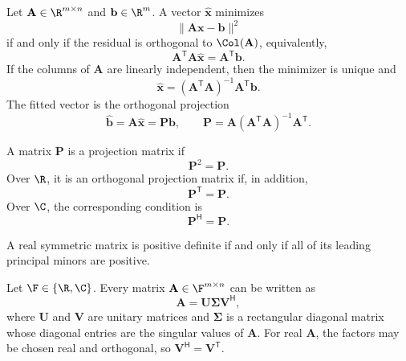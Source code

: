     \begin{theorem}
        Let $\mathbf{A}\in\R^{m\times n}$ and
        $\mathbf{b}\in\R^m$. A vector $\widehat{\mathbf{x}}$ minimizes
        \[
            \|\mathbf{A}\mathbf{x}-\mathbf{b}\|^2
        \]
        if and only if the residual is orthogonal to
        $\Col(\mathbf{A})$, equivalently,
        \[
            \mathbf{A}^{\mathsf T}\mathbf{A}\widehat{\mathbf{x}}
            =
            \mathbf{A}^{\mathsf T}\mathbf{b}.
        \]
        If the columns of $\mathbf{A}$ are linearly independent, then the
        minimizer is unique and
        \[
            \widehat{\mathbf{x}}
            =
            (\mathbf{A}^{\mathsf T}\mathbf{A})^{-1}
            \mathbf{A}^{\mathsf T}\mathbf{b}.
        \]
        The fitted vector is the orthogonal projection
        \[
            \widehat{\mathbf{b}}
            =
            \mathbf{A}\widehat{\mathbf{x}}
            =
            \mathbf{P}\mathbf{b},
            \qquad
            \mathbf{P}
            =
            \mathbf{A}(\mathbf{A}^{\mathsf T}\mathbf{A})^{-1}
            \mathbf{A}^{\mathsf T}.
        \]
    \end{theorem}

    \begin{proposition}
        A matrix $\mathbf{P}$ is a projection matrix if
        \[
            \mathbf{P}^2=\mathbf{P}.
        \]
        Over $\R$, it is an orthogonal projection matrix if, in addition,
        \[
            \mathbf{P}^{\mathsf T}=\mathbf{P}.
        \]
        Over $\C$, the corresponding condition is
        \[
            \mathbf{P}^{\mathsf H}=\mathbf{P}.
        \]
    \end{proposition}

    \begin{theorem}
        A real symmetric matrix is positive definite if and only if all of its
        leading principal minors are positive.
    \end{theorem}

    \begin{theorem}
        Let $\F\in\{\R,\C\}$. Every matrix
        $\mathbf{A}\in\F^{m\times n}$ can be
        written as
        \[
            \mathbf{A}
            =
            \mathbf{U}\boldsymbol{\Sigma}\mathbf{V}^{\mathsf H},
        \]
        where $\mathbf{U}$ and $\mathbf{V}$ are unitary matrices and
        $\boldsymbol{\Sigma}$ is a rectangular diagonal matrix whose diagonal
        entries are the singular values of $\mathbf{A}$. For real
        $\mathbf{A}$, the factors may be chosen real and orthogonal, so
        $\mathbf{V}^{\mathsf H}=\mathbf{V}^{\mathsf T}$.
    \end{theorem}

